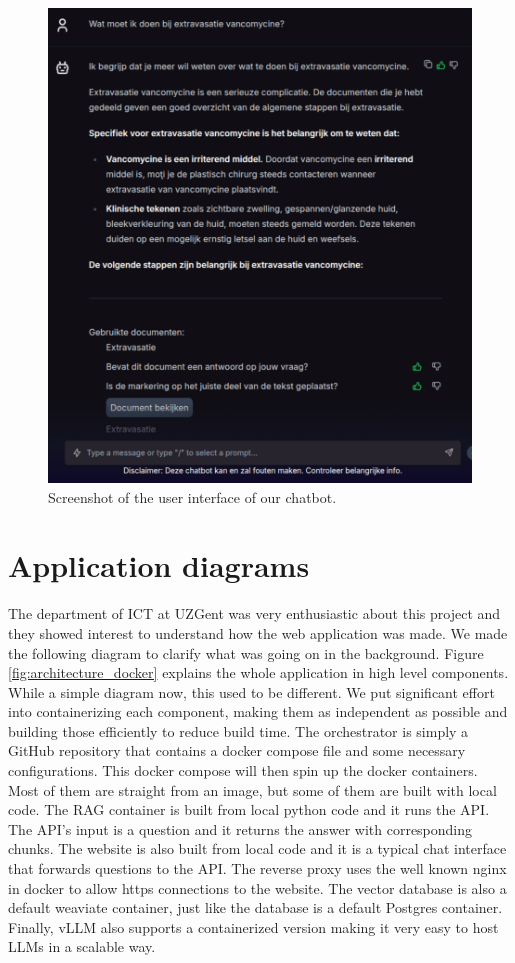 \begin{figure}[h]
    \centerline{\includegraphics[width=0.7\linewidth]{fig/chatbot_zenya.png}}
    \caption{Screenshot of the user interface of our chatbot.}
    \label{fig:chatbot_zenya}
\end{figure}

\section{Application diagrams}
The department of ICT at UZGent was very enthusiastic about this project and they showed interest to understand how the web application was made. We made the following diagram to clarify what was going on in the background. Figure \ref{fig:architecture_docker} explains the whole application in high level components. While a simple diagram now, this used to be different. We put significant effort into containerizing each component, making them as independent as possible and building those efficiently to reduce build time. The orchestrator is simply a GitHub repository that contains a docker compose file and some necessary configurations. This docker compose will then spin up the docker containers. Most of them are straight from an image, but some of them are built with local code. The RAG container is built from local python code and it runs the API. The API's input is a question and it returns the answer with corresponding chunks. The website is also built from local code and it is a typical chat interface that forwards questions to the API. The reverse proxy uses the well known nginx in docker to allow https connections to the website. The vector database is also a default weaviate container, just like the database is a default Postgres container. Finally, vLLM also supports a containerized version making it very easy to host LLMs in a scalable way.


